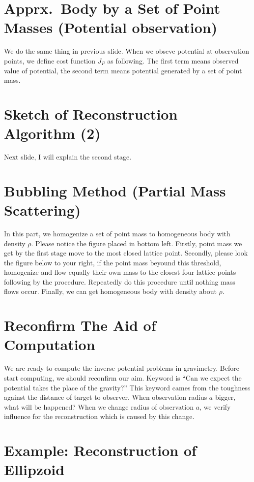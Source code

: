 \documentclass[uplatex,12pt]{jsarticle}
\begin{document}
\section{Apprx.~Body by a Set of Point Masses (Potential observation)}

We do the same thing in previous slide.
When we obseve potential at observation points, we define cost function $J_P$ as following.
The first term means observed value of potential, the second term means potential generated by a set of point mass.

\section{Sketch of Reconstruction Algorithm (2)}

Next slide, I will explain the second stage.

\section{Bubbling Method (Partial Mass Scattering)}

In this part, we homogenize a set of point mass to homogeneous body with density $\rho$.
Please notice the figure placed in bottom left.
Firstly, point mass we get by the first stage move to the most closed lattice point.
Secondly, please look the figure below to your right, if the point mass beyound this threshold, 
homogenize and flow equally their own mass to the closest four lattice points following by the procedure.
Repeatedly do this procedure until nothing mass flows occur.
Finally, we can get homogeneous body with density about $\rho$.

\section{Reconfirm The Aid of Computation}

We are ready to compute the inverse potential problems in gravimetry.
Before start computing, we should reconfirm our aim.
Keyword is ``Can we expect the potential takes the place of the gravity?''
This keyword cames from the toughness against the distance of target to observer.
When observation radius $a$ bigger, what will be happened?
When we change radius of observation $a$, 
we verify influence for the reconstruction which is caused by this change.

\section{Example: Reconstruction of Ellipzoid}
\end{document}
